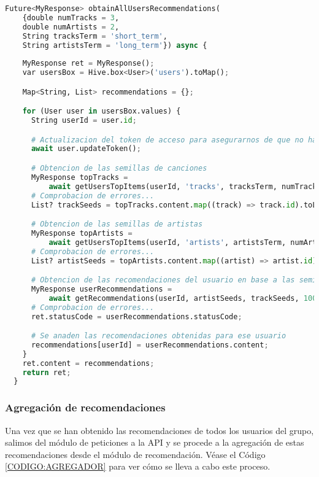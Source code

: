 \begin{lstlisting}[language=python, caption=Obtención de recomendaciones para un usuario, label=CODIGO:OBTENCION_RECOMENDACIONES]
  Future<MyResponse> obtainAllUsersRecommendations(
    {double numTracks = 3,
    double numArtists = 2,
    String tracksTerm = 'short_term',
    String artistsTerm = 'long_term'}) async {
    
    MyResponse ret = MyResponse();
    var usersBox = Hive.box<User>('users').toMap();

    Map<String, List> recommendations = {};

    for (User user in usersBox.values) {
      String userId = user.id;

      # Actualizacion del token de acceso para asegurarnos de que no haya problemas
      await user.updateToken();

      # Obtencion de las semillas de canciones
      MyResponse topTracks =
          await getUsersTopItems(userId, 'tracks', tracksTerm, numTracks);
      # Comprobacion de errores...
      List? trackSeeds = topTracks.content.map((track) => track.id).toList();

      # Obtencion de las semillas de artistas
      MyResponse topArtists =
          await getUsersTopItems(userId, 'artists', artistsTerm, numArtists);
      # Comprobacion de errores...
      List? artistSeeds = topArtists.content.map((artist) => artist.id).toList();

      # Obtencion de las recomendaciones del usuario en base a las semillas obtenidas
      MyResponse userRecommendations =
          await getRecommendations(userId, artistSeeds, trackSeeds, 100);
      # Comprobacion de errores...
      ret.statusCode = userRecommendations.statusCode;

      # Se anaden las recomendaciones obtenidas para ese usuario
      recommendations[userId] = userRecommendations.content;
    }
    ret.content = recommendations;
    return ret;
  }
\end{lstlisting}


\subsubsection{Agregación de recomendaciones\label{subsec:agregacion_recomendaciones_implementacion}}

Una vez que se han obtenido las recomendaciones de todos los usuarios del grupo, salimos del módulo de peticiones a la API 
y se procede a la agregación de estas recomendaciones desde el módulo de recomendación. Véase el Código \ref{CODIGO:AGREGADOR} 
para ver cómo se lleva a cabo este proceso. 


